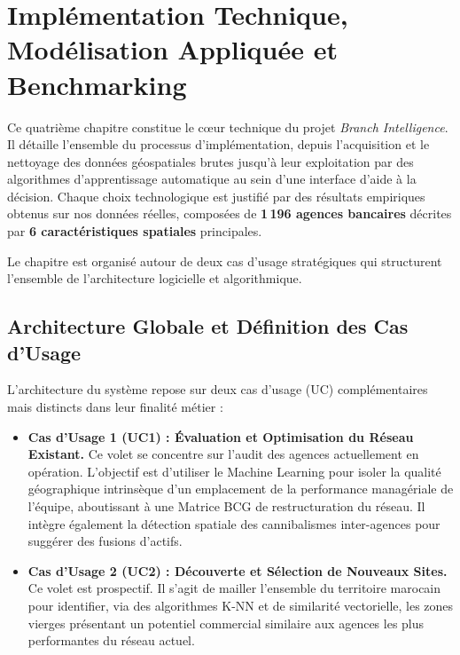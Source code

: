 \documentclass[11pt,a4paper,twoside]{report}
\begin{document}

\chapter{Implémentation Technique, Modélisation Appliquée et Benchmarking}

Ce quatrième chapitre constitue le cœur technique du projet \textit{Branch Intelligence}. Il détaille l'ensemble du processus d'implémentation, depuis l'acquisition et le nettoyage des données géospatiales brutes jusqu'à leur exploitation par des algorithmes d'apprentissage automatique au sein d'une interface d'aide à la décision. Chaque choix technologique est justifié par des résultats empiriques obtenus sur nos données réelles, composées de \textbf{1\,196 agences bancaires} décrites par \textbf{6 caractéristiques spatiales} principales.

Le chapitre est organisé autour de deux cas d'usage stratégiques qui structurent l'ensemble de l'architecture logicielle et algorithmique.

\section{Architecture Globale et Définition des Cas d'Usage}

L'architecture du système repose sur deux cas d'usage (UC) complémentaires mais distincts dans leur finalité métier :

\begin{itemize}
    \item \textbf{Cas d'Usage 1 (UC1) : Évaluation et Optimisation du Réseau Existant.} Ce volet se concentre sur l'audit des agences actuellement en opération. L'objectif est d'utiliser le Machine Learning pour isoler la qualité géographique intrinsèque d'un emplacement de la performance managériale de l'équipe, aboutissant à une Matrice BCG de restructuration du réseau. Il intègre également la détection spatiale des cannibalismes inter-agences pour suggérer des fusions d'actifs.
    \item \textbf{Cas d'Usage 2 (UC2) : Découverte et Sélection de Nouveaux Sites.} Ce volet est prospectif. Il s'agit de mailler l'ensemble du territoire marocain pour identifier, via des algorithmes K-NN et de similarité vectorielle, les zones vierges présentant un potentiel commercial similaire aux agences les plus performantes du réseau actuel.
\end{itemize}
\end{document}
